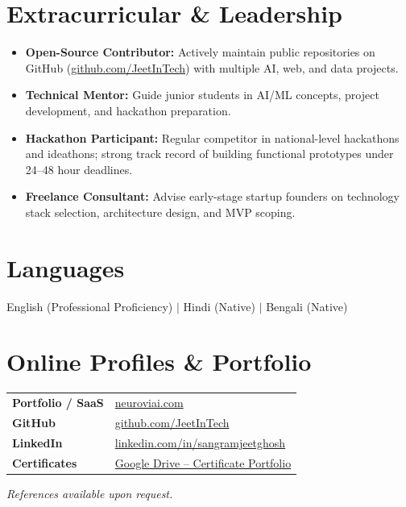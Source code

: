 \documentclass[11pt]{article}
\begin{document}
\section*{Extracurricular \& Leadership}
\begin{itemize}
\item \textbf{Open-Source Contributor:} Actively maintain public repositories on GitHub (\href{https://github.com/JeetInTech}{github.com/JeetInTech}) with multiple AI, web, and data projects.
\item \textbf{Technical Mentor:} Guide junior students in AI/ML concepts, project development, and hackathon preparation.
\item \textbf{Hackathon Participant:} Regular competitor in national-level hackathons and ideathons; strong track record of building functional prototypes under 24--48 hour deadlines.
\item \textbf{Freelance Consultant:} Advise early-stage startup founders on technology stack selection, architecture design, and MVP scoping.
\end{itemize}

\section*{Languages}
English (Professional Proficiency) \quad $|$ \quad Hindi (Native) \quad $|$ \quad Bengali (Native)

\section*{Online Profiles \& Portfolio}
\begin{tabularx}{\textwidth}{@{}l X@{}}
\textbf{Portfolio / SaaS} & \href{https://neuroviai.com}{neuroviai.com} \\
\textbf{GitHub} & \href{https://github.com/JeetInTech}{github.com/JeetInTech} \\
\textbf{LinkedIn} & \href{https://www.linkedin.com/in/sangramjeetghosh}{linkedin.com/in/sangramjeetghosh} \\
\textbf{Certificates} & \href{https://drive.google.com/drive/folders/1ZQd-DeX-rXlEVDTwDJfjLjnG7iPc_fEw}{Google Drive -- Certificate Portfolio} \\
\end{tabularx}

\vfill
\begin{center}
\small\textit{References available upon request.}
\end{center}
\end{document}
